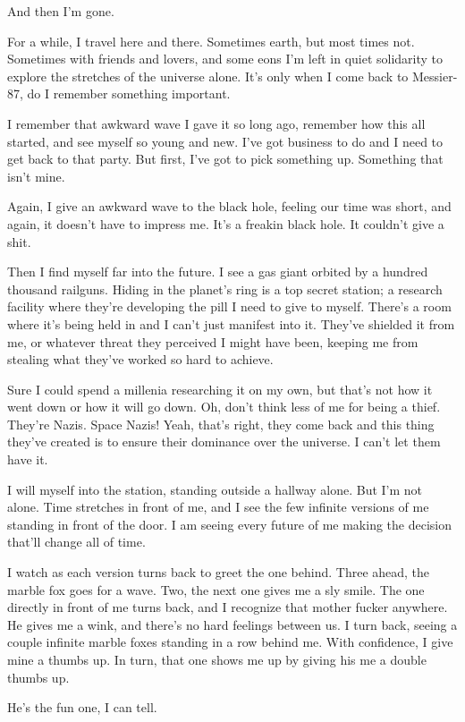 And then I'm gone.

For a while, I travel here and there. Sometimes earth, but most times not. Sometimes with friends and lovers, and some eons I'm left in quiet solidarity to explore the stretches of the universe alone. It's only when I come back to Messier-87, do I remember something important.

I remember that awkward wave I gave it so long ago, remember how this all started, and see myself so young and new. I've got business to do and I need to get back to that party. But first, I've got to pick something up. Something that isn't mine.

Again, I give an awkward wave to the black hole, feeling our time was short, and again, it doesn't have to impress me. It's a freakin black hole. It couldn't give a shit.

Then I find myself far into the future. I see a gas giant orbited by a hundred thousand railguns. Hiding in the planet's ring is a top secret station; a research facility where they're developing the pill I need to give to myself. There's a room where it's being held in and I can't just manifest into it. They've shielded it from me, or whatever threat they perceived I might have been, keeping me from stealing what they've worked so hard to achieve.

Sure I could spend a millenia researching it on my own, but that's not how it went down or how it will go down. Oh, don't think less of me for being a thief. They're Nazis. Space Nazis! Yeah, that's right, they come back and this thing they've created is to ensure their dominance over the universe. I can't let them have it.

I will myself into the station, standing outside a hallway alone. But I'm not alone. Time stretches in front of me, and I see the few infinite versions of me standing in front of the door. I am seeing every future of me making the decision that'll change all of time.

I watch as each version turns back to greet the one behind. Three ahead, the marble fox goes for a wave. Two, the next one gives me a sly smile. The one directly in front of me turns back, and I recognize that mother fucker anywhere. He gives me a wink, and there's no hard feelings between us. I turn back, seeing a couple infinite marble foxes standing in a row behind me. With confidence, I give mine a thumbs up. In turn, that one shows me up by giving his me a double thumbs up.

He's the fun one, I can tell.

